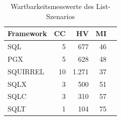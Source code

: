 \begin{table}[ht]
\centering
\caption{Wartbarkeitsmesswerte des List-Szenarios}
\begin{tabular}{lrrrr}
\toprule
Framework & CC & HV & MI \\
\midrule
	SQL & 5 & 677 & 46 \\
	PGX & 5 & 628 & 48 \\
	SQUIRREL & 10 & 1.271 & 37 \\
	SQLX & 3 & 500 & 51 \\
	SQLC & 3 & 310 & 57 \\
	SQLT & 1 & 104 & 75 \\
\bottomrule
\end{tabular}
\label{tab:wartbarkeit_list}
\end{table}
	